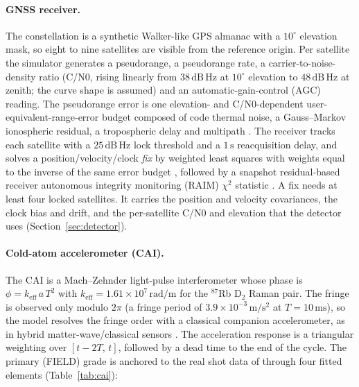 \documentclass[journal]{IEEEtran}
\begin{document}
\paragraph{GNSS receiver.}
The constellation is a synthetic Walker-like GPS almanac with a $10^\circ$ elevation mask, so eight to nine
satellites are visible from the reference origin. Per satellite the simulator generates a pseudorange,
a pseudorange rate, a carrier-to-noise-density ratio (C/N0, rising linearly from $38\,\mathrm{dB\,Hz}$ at
$10^\circ$ elevation to $48\,\mathrm{dB\,Hz}$ at zenith; the curve shape is assumed) and an automatic-gain-control
(AGC) reading. The pseudorange error is one elevation- and C/N0-dependent user-equivalent-range-error
budget composed of code thermal noise, a Gauss--Markov ionospheric residual, a tropospheric delay and
multipath \cite{kaplan2017understanding}. The receiver tracks each satellite with a $25\,\mathrm{dB\,Hz}$
lock threshold and a $1\,\mathrm{s}$ reacquisition delay, and solves a position/velocity/clock
\emph{fix} by weighted least squares with weights equal to the inverse of the same error budget
\cite{misra2006global}, followed by a snapshot residual-based receiver autonomous integrity monitoring
(RAIM) $\chi^2$ statistic \cite{pullen2020gnss}. A fix needs at least four locked satellites. It carries the
position and velocity covariances, the clock bias and drift, and the per-satellite C/N0 and elevation that
the detector uses (Section~\ref{sec:detector}).

\paragraph{Cold-atom accelerometer (CAI).}
The CAI is a Mach--Zehnder light-pulse interferometer whose phase is $\phi = k_{\mathrm{eff}}\,a\,T^2$ with
$k_{\mathrm{eff}} = 1.61\times10^{7}\,\mathrm{rad/m}$ for the $^{87}$Rb D$_2$ Raman pair. The fringe is
observed only modulo $2\pi$ (a fringe period of $3.9\times10^{-3}\,\mathrm{m/s^2}$ at $T = 10\,\mathrm{ms}$),
so the model resolves the fringe order with a classical companion accelerometer, as in hybrid
matter-wave/classical sensors \cite{cheiney2018navigation,templier2022tracking,wright2022cold}. The acceleration response is a triangular weighting
over $[t-2T,\,t]$, followed by a dead time to the end of the cycle. The primary (FIELD) grade is anchored to
the real shot data of \cite{darmagnac2024atom,darmagnac2024dataset} through four fitted elements
(Table~\ref{tab:cai}):
\end{document}
